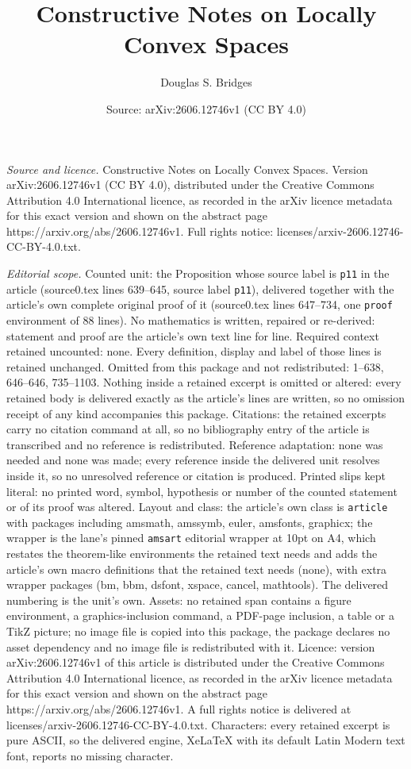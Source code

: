 \documentclass[10pt,a4paper]{amsart}
\title[Constructive Notes on Locally Convex Spaces]{Constructive Notes on Locally Convex Spaces}
\author{Douglas S. Bridges}
\date{Source: arXiv:2606.12746v1 (CC BY 4.0)}
\begin{document}
\maketitle

\noindent\emph{Source and licence.} Constructive Notes on Locally Convex Spaces. Version arXiv:2606.12746v1 (CC BY 4.0), distributed under the Creative Commons Attribution 4.0 International licence, as recorded in the arXiv licence metadata for this exact version and shown on the abstract page https://arxiv.org/abs/2606.12746v1. Full rights notice: licenses/arxiv-2606.12746-CC-BY-4.0.txt.\par\smallskip

\noindent\textit{Editorial scope.} Counted unit: the Proposition whose source label is \texttt{p11} in the article (source0.tex lines 639--645, source label \texttt{p11}), delivered together with the article's own complete original proof of it (source0.tex lines 647--734, one \texttt{proof} environment of 88 lines). No mathematics is written, repaired or re-derived: statement and proof are the article's own text line for line. Required context retained uncounted: none. Every definition, display and label of those lines is retained unchanged. Omitted from this package and not redistributed: 1--638, 646--646, 735--1103. Nothing inside a retained excerpt is omitted or altered: every retained body is delivered exactly as the article's lines are written, so no omission receipt of any kind accompanies this package. Citations: the retained excerpts carry no citation command at all, so no bibliography entry of the article is transcribed and no reference is redistributed. Reference adaptation: none was needed and none was made; every reference inside the delivered unit resolves inside it, so no unresolved reference or citation is produced. Printed slips kept literal: no printed word, symbol, hypothesis or number of the counted statement or of its proof was altered. Layout and class: the article's own class is \texttt{article} with packages including amsmath, amssymb, euler, amsfonts, graphicx; the wrapper is the lane's pinned \texttt{amsart} editorial wrapper at 10pt on A4, which restates the theorem-like environments the retained text needs and adds the article's own macro definitions that the retained text needs (none), with extra wrapper packages (bm, bbm, dsfont, xspace, cancel, mathtools). The delivered numbering is the unit's own. Assets: no retained span contains a figure environment, a graphics-inclusion command, a PDF-page inclusion, a table or a TikZ picture; no image file is copied into this package, the package declares no asset dependency and no image file is redistributed with it. Licence: version arXiv:2606.12746v1 of this article is distributed under the Creative Commons Attribution 4.0 International licence, as recorded in the arXiv licence metadata for this exact version and shown on the abstract page https://arxiv.org/abs/2606.12746v1. A full rights notice is delivered at licenses/arxiv-2606.12746-CC-BY-4.0.txt. Characters: every retained excerpt is pure ASCII, so the delivered engine, XeLaTeX with its default Latin Modern text font, reports no missing character.
\end{document}
